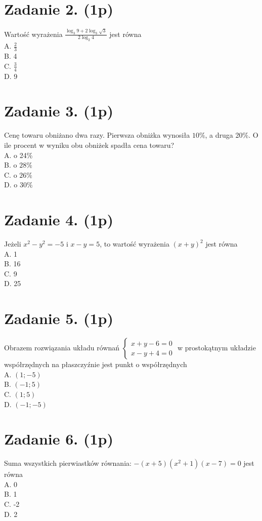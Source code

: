 \documentclass[10pt]{article}
\begin{document}
\section*{Zadanie 2. (1p)}
Wartość wyrażenia \(\frac{\log _{3} 9+2 \log _{3} \sqrt{3}}{2 \log _{2} 4}\) jest równa\\
A. \(\frac{2}{3}\)\\
B. 4\\
C. \(\frac{3}{4}\)\\
D. 9

\section*{Zadanie 3. (1p)}
Cenę towaru obniżano dwa razy. Pierwsza obniżka wynosiła \(10 \%\), a druga 20\%. O ile procent w wyniku obu obniżek spadła cena towaru?\\
A. o 24\%\\
B. o \(28 \%\)\\
C. o \(26 \%\)\\
D. o \(30 \%\)

\section*{Zadanie 4. (1p)}
Jeżeli \(x^{2}-y^{2}=-5\) i \(x-y=5\), to wartość wyrażenia \((x+y)^{2}\) jest równa\\
A. 1\\
B. 16\\
C. 9\\
D. 25

\section*{Zadanie 5. (1p)}
Obrazem rozwiązania układu równań \(\left\{\begin{array}{l}x+y-6=0 \\ x-y+4=0\end{array}\right.\) w prostokątnym układzie współrzędnych na płaszczyźnie jest punkt o współrzędnych\\
A. \((1 ;-5)\)\\
B. \((-1 ; 5)\)\\
C. \((1 ; 5)\)\\
D. \((-1 ;-5)\)

\section*{Zadanie 6. (1p)}
Suma wszystkich pierwiastków równania: \(-(x+5)\left(x^{2}+1\right)(x-7)=0\) jest równa\\
A. 0\\
B. 1\\
C. -2\\
D. 2
\end{document}
